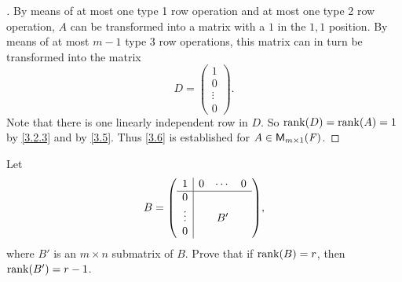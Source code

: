 \begin{proof}[]
	By means of at most one type 1 row operation and at most one type 2 row operation, \(A\) can be transformed into a matrix with a \(1\) in the \(1,1\) position.
	By means of at most \(m - 1\) type 3 row operations, this matrix can in turn be transformed into the matrix
	\[
		D = \begin{pmatrix}
			1      \\
			0      \\
			\vdots \\
			0
		\end{pmatrix}.
	\]
	Note that there is one linearly independent row in \(D\).
	So \(\rk{D} = \rk{A} = 1\) by \cref{3.2.3} and by \cref{3.5}.
	Thus \cref{3.6} is established for \(A \in \mathsf{M}_{{m} \times 1}({\mathit{F}})\).
\end{proof}

\begin{ex}\label{ex:3.2.11}
	Let
	\[
		B = \pa{\begin{array}{c|ccc}
				1      & 0 & \cdots & 0 \\
				\hline
				0      &   &        &   \\
				\vdots &   & B'     &   \\
				0      &   &        &
			\end{array}},
	\]
	where \(B'\) is an \(m \times n\) submatrix of \(B\).
	Prove that if \(\rk{B} = r\), then \(\rk{B'} = r - 1\).
\end{ex}

